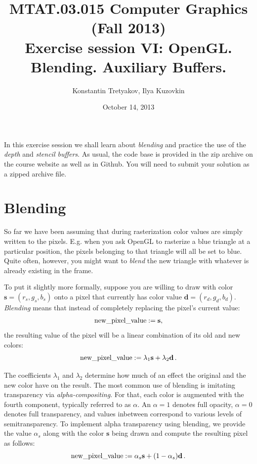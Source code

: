 \documentclass{article}
\newcommand{\bd}{\mathbf{d}}
\newcommand{\bs}{\mathbf{s}}
\begin{document}
\title{MTAT.03.015 Computer Graphics (Fall 2013)\\
Exercise session VI: OpenGL. Blending. Auxiliary Buffers.}
\author{Konstantin Tretyakov, Ilya Kuzovkin}
\date{October 14, 2013}
\maketitle

In this exercise session we shall learn about \emph{blending} and practice the use of the \emph{depth} and \emph{stencil buffers}. As usual, the code base is provided in the zip archive on the course website as well as in Github. You will need to submit your solution as a zipped archive file.

\section{Blending}
So far we have been assuming that during rasterization color values are simply written to the pixels. E.g. when you ask OpenGL to rasterize a blue triangle at a particular position, the pixels belonging to that triangle will all be set to blue. Quite often, however, you might want to \emph{blend} the new triangle with whatever is already existing in the frame. 

To put it slightly more formally, suppose you are willing to draw with color $\bs = (r_s, g_s, b_s)$ onto a pixel that currently has color value $\bd = (r_d, g_d, b_d)$. \emph{Blending} means that instead of completely replacing the pixel's current value:
$$
\text{new\textunderscore pixel\textunderscore value} := \bs,
$$
the resulting value of the pixel will be a linear combination of its old and new colors:
$$
\text{new\textunderscore pixel\textunderscore value} := \lambda_1 \bs + \lambda_2 \bd\,.
$$

The coefficients $\lambda_1$ and $\lambda_2$ determine how much of an effect the original and the new color have on the result. The most common use of blending is imitating transparency via \emph{alpha-compositing}. For that, each color is augmented with the fourth component, typically referred to as $\alpha$. An $\alpha = 1$ denotes full opacity, $\alpha = 0$ denotes full transparency, and values inbetween correspond to various levels of semitransparency. To implement alpha transparency using blending, we provide the value $\alpha_s$ along with the color $\bs$ being drawn and compute the resulting pixel as follows:
$$
\text{new\textunderscore pixel\textunderscore value} := \alpha_s \bs + (1-\alpha_s) \bd\,.
$$
\end{document}
